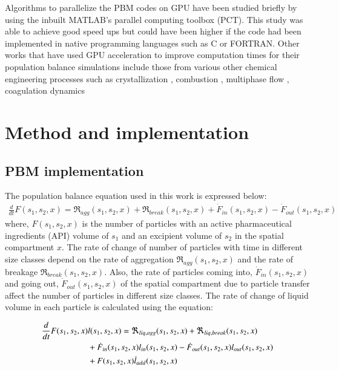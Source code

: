 \documentclass[preprint,10pt,authoryear]{elsarticle}
\begin{document}
\begin{linenumbers}
Algorithms to parallelize the PBM codes on GPU have been studied briefly by \cite{Prakash2013b} 
using the inbuilt MATLAB's parallel computing toolbox (PCT). This study was able to achieve 
good speed ups but could have been higher if the code had been implemented in native programming 
languages such as C or FORTRAN. Other works that have used GPU acceleration to improve computation 
times for their population balance simulations include those from various other chemical engineering 
processes such as crystallization \citep{Szilagy2016} , combustion \citep{Shi2012} , multiphase flow 
\citep{santos2013} , coagulation dynamics \citep{Xu2015}


\section{Method and implementation}
\label{secMethods}
\subsection{PBM implementation}
The population balance equation used in this work is expressed below:
\begin{align}
\frac{d}{dt}F(s_1,s_2,x)=\Re_{agg}(s_1,s_2,x)+\Re_{break}(s_1,s_2,x)+\dot{F}_{in}(s_1,s_2,x)-\dot{F}_{out}(s_1,s_2,x)
\label{eqn:mthds_pbm_overall} 
\end{align}
where, $F(s_1,s_2,x)$ is the number of particles with an active pharmaceutical ingredients (API) volume of $s_1$ and an excipient 
volume of $s_2$ in the spatial compartment $x$. The rate of change of number of particles with time 
in different size classes depend on the rate of aggregation $\Re_{agg}(s_1,s_2,x)$ and the rate of 
breakage $\Re_{break}(s_1,s_2,x)$. Also, the rate of particles coming into, $\dot{F}_{in}(s_1,s_2,x)$ and 
going out, $\dot{F}_{out}(s_1,s_2,x)$ of the spatial compartment due to particle transfer affect the number of 
particles in different size classes. 
The rate of change of liquid volume in each particle is calculated using the equation: 

\begin{align}
\frac{d}{dt}F(s_1,s_2,x)&l(s_1,s_2,x)= 
\Re_{liq,agg}(s_1,s_2,x)+\Re_{liq,break}(s_1,s_2,x)\notag\\
&+\dot{F}_{in}(s_1,s_2,x)l_{in}(s_1,s_2,x)-\dot{F}_{out}(s_1,s_2,x)l_{out}(s_1,s_2,x)\notag \\&+F(s_1,s_2,x)\dot{l}_{add}(s_1,s_2,x)
\label{eqn:mthds_pbm_rate} 
\end{align}


\end{linenumbers}
\end{document}
